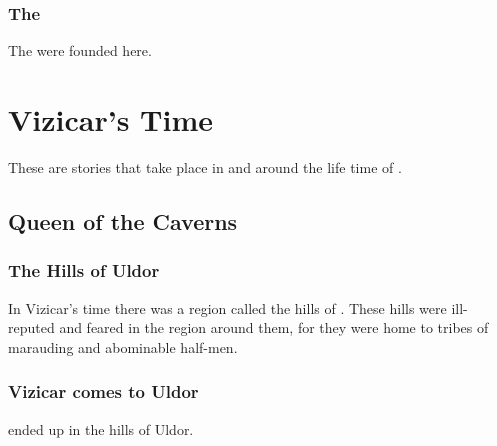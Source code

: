 \subsection{The \vclans}
The  were founded here. 
























\chapter{Vizicar's Time}
These are stories that take place in and around the life time of . 















\section{Queen of the Caverns}









\subsection{The Hills of Uldor}
In Vizicar's time there was a region called the hills of . 
These hills were ill-reputed and feared in the region around them, for they were home to tribes of marauding and abominable half-men. 









\subsection{Vizicar comes to Uldor}
\VizicarDurasRespina ended up in the hills of Uldor.





